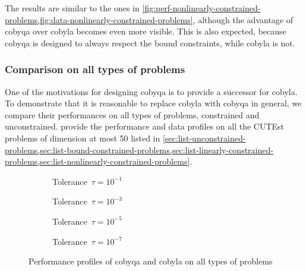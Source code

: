 The results are similar to the ones in \cref{fig:perf-nonlinearly-constrained-problems,fig:data-nonlinearly-constrained-problems}, although the advantage of \gls{cobyqa} over \gls{cobyla} becomes even more visible.
This is also expected, because \gls{cobyqa} is designed to always respect the bound constraints, while \gls{cobyla} is not.

\subsubsection{Comparison on all types of problems}

One of the motivations for designing \gls{cobyqa} is to provide a successor for \gls{cobyla}.
To demonstrate that it is reasonable to replace \gls{cobyla} with \gls{cobyqa} in general, we compare their performances on all types of problems, constrained and unconstrained.
 provide the performance and data profiles on all the CUTEst problems of dimension at most \num{50} listed in \cref{sec:list-unconstrained-problems,sec:list-bound-constrained-problems,sec:list-linearly-constrained-problems,sec:list-nonlinearly-constrained-problems}.

\begin{figure}[ht]
    \centering
    \begin{subfigure}[b]{0.49\textwidth}
        \centering
        \caption{Tolerance~$\tau = 10^{-1}$}
    \end{subfigure}
    \hfill
    \begin{subfigure}[b]{0.49\textwidth}
        \centering
        \caption{Tolerance~$\tau = 10^{-3}$}
    \end{subfigure}
    \begin{subfigure}[b]{0.49\textwidth}
        \centering
        \caption{Tolerance~$\tau = 10^{-5}$}
    \end{subfigure}
    \hfill
    \begin{subfigure}[b]{0.49\textwidth}
        \centering
        \caption{Tolerance~$\tau = 10^{-7}$}
    \end{subfigure}
    \caption[Performance profiles on all problems]{Performance profiles of \gls{cobyqa} and \gls{cobyla} on all types of problems}
    \label{fig:perf-all-problems}
\end{figure}

